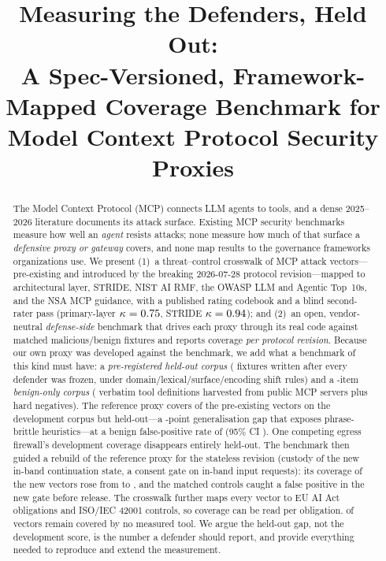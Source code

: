 \documentclass[conference]{IEEEtran}
\newcommand{\rev}{2026-07-28}
\begin{document}
\title{Measuring the Defenders, Held Out:\\ A Spec-Versioned, Framework-Mapped Coverage Benchmark for Model Context Protocol Security Proxies}
\author{}
\maketitle

\begin{abstract}
The Model Context Protocol (MCP) connects LLM agents to tools, and a dense 2025--2026 literature documents its attack surface. Existing MCP security benchmarks measure how well an \emph{agent} resists attacks; none measure how much of that surface a \emph{defensive proxy or gateway} covers, and none map results to the governance frameworks organizations use. We present (1)~a threat--control crosswalk of \nVectors{} MCP attack vectors---\nOrig{} pre-existing and \nNew{} introduced by the breaking \rev{} protocol revision---mapped to architectural layer, STRIDE, NIST AI RMF, the OWASP LLM and Agentic Top~10s, and the NSA MCP guidance, with a published rating codebook and a blind second-rater pass (primary-layer $\kappa=0.75$, STRIDE $\kappa=0.94$); and (2)~an open, vendor-neutral \emph{defense-side} benchmark that drives each proxy through its real code against matched malicious/benign fixtures and reports coverage \emph{per protocol revision}. Because our own proxy was developed against the benchmark, we add what a benchmark of this kind must have: a \emph{pre-registered held-out corpus} (\nHeldout{} fixtures written after every defender was frozen, under domain/lexical/surface/encoding shift rules) and a \nBenign-item \emph{benign-only corpus} (\nHarvested{} verbatim tool definitions harvested from public MCP servers plus \nHardNeg{} hard negatives). The reference proxy covers \bastDevOrig{} of the \nOrig{} pre-existing vectors on the development corpus but \bastHeldout{} held-out---a \bastGap-point generalisation gap that exposes phrase-brittle heuristics---at a benign false-positive rate of \bastBenignRate{} (95\% CI \bastBenignCI). One competing egress firewall's development coverage disappears entirely held-out. The benchmark then guided a rebuild of the reference proxy for the stateless revision (custody of the new in-band continuation state, a consent gate on in-band input requests): its coverage of the \nNew{} new vectors rose from \bastNewPrev{} to \bastNew, and the matched controls caught a false positive in the new gate before release. The crosswalk further maps every vector to EU AI Act obligations and ISO/IEC 42001 controls, so coverage can be read per obligation. \nCoveredNone{} of \nVectors{} vectors remain covered by no measured tool. We argue the held-out gap, not the development score, is the number a defender should report, and provide everything needed to reproduce and extend the measurement.
\end{abstract}
\end{document}
